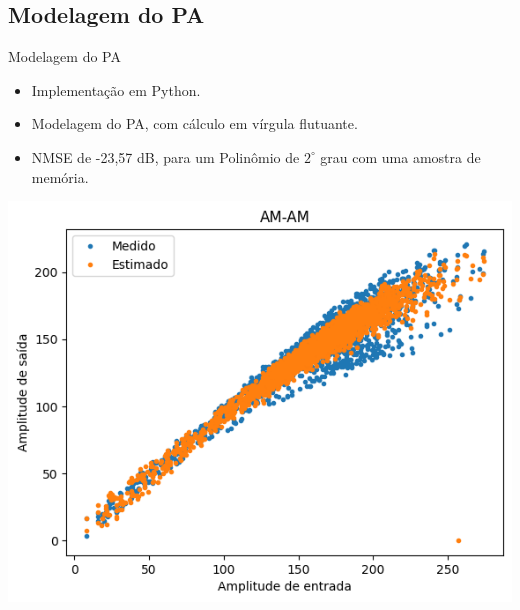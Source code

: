 \documentclass{if-beamer}
\begin{document}
\subsection{Modelagem do PA}
\begin{frame}{Modelagem do PA}
	
	
	\begin{minipage}{0.5\textwidth}
		\begin{itemize}
			\item  Implementação em Python.
			\item Modelagem do PA, com cálculo em vírgula flutuante.
			\item NMSE de -23,57 dB, para um Polinômio de $2^{\circ}$  grau com uma amostra de memória.
		\end{itemize}
	\end{minipage}%
	\hspace{0.04\textwidth}
	\begin{minipage}{0.5\textwidth}
		
		\includegraphics[scale=0.4]{modeloPA.png}
		
	\end{minipage}%
\end{frame}
\end{document}

